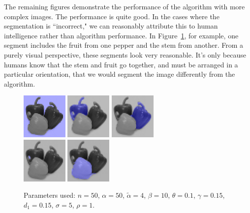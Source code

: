 \documentclass[12pt]{article}%
\begin{document}
The remaining figures demonstrate the performance of the algorithm with more complex images. The performance is quite good. In the cases where the segmentation is ``incorrect," we can reasonably attribute this to human intelligence rather than algorithm performance. In Figure~\ref{fig:peppers}, for example, one segment includes the fruit from one pepper and the stem from another. From a purely visual perspective, these segments look very reasonable. It's only because humans know that the stem and fruit go together, and must be arranged in a particular orientation, that we would segment the image differently from the algorithm.

\begin{figure}
\centering
\includegraphics[width=0.2\textwidth,height=0.2\textwidth]{peppers_seg_1.png} \hspace{.45cm}
\includegraphics[width=0.2\textwidth,height=0.2\textwidth]{peppers_seg_2.png} \hspace{.45cm}
\includegraphics[width=0.2\textwidth,height=0.2\textwidth]{peppers_seg_3.png} \\ \vspace{.45cm}
\includegraphics[width=0.2\textwidth,height=0.2\textwidth]{peppers_seg_4.png} \hspace{.45cm}
\includegraphics[width=0.2\textwidth,height=0.2\textwidth]{peppers_seg_5.png}
\caption{Parameters used: $n = 50$, $\alpha = 50$, $\tilde{\alpha} = 4$, $\beta = 10$, $\theta = 0.1$, $\gamma = 0.15$, $d_1 = 0.15$, $\sigma = 5$, $\rho = 1$.}
\label{fig:peppers}
\end{figure}
\end{document}
